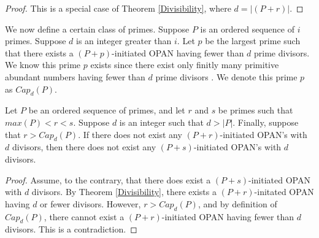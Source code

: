 \documentclass[../paper.tex]{subfiles}
\begin{document}
\begin{proof}
This is a special case of Theorem {\ref{Divisibility}}, where $d = |(P + r)|$.
\end{proof}

We now define a certain class of primes.
Suppose $P$ is an ordered sequence of $i$ primes. Suppose $d$ is
an integer greater than $i$. Let $p$ be the largest prime such 
that there exists a $(P + p)$-initiated OPAN having fewer than $d$ 
prime divisors. We know this prime $p$ exists since 
there exist only finitly many primitive abundant numbers having
fewer than $d$ prime divisors \cite{dickson}. We denote this prime $p$
as $Cap_d(P)$. 

\begin{theorem}\label{cap}
Let $P$ be an ordered sequence of primes, and  let $r$ and $s$ be 
primes such that $max(P) < r < s$. Suppose $d$ is an integer such
that $d > |P|$. Finally, suppose that $r > Cap_d(P)$. If there
does not exist any $(P + r)$-initiated OPAN's with $d$ divisors,
then there does not exist any $(P + s)$-initiated OPAN's with $d$ 
divisors.
\end{theorem}

\begin{proof}
Assume, to the contrary, that there does exist a $(P + 
s)$-initiated OPAN with $d$ divisors. By Theorem {\ref{Divisibility}},
there exists a $(P + r)$-initated OPAN having $d$ or fewer
divisors. However, $r > Cap_d(P)$, and by definition of
$Cap_d(P)$, there cannot exist a $(P + r)$-initiated OPAN having
fewer than $d$ divisors. This is a contradiction.
\end{proof}
\end{document}
